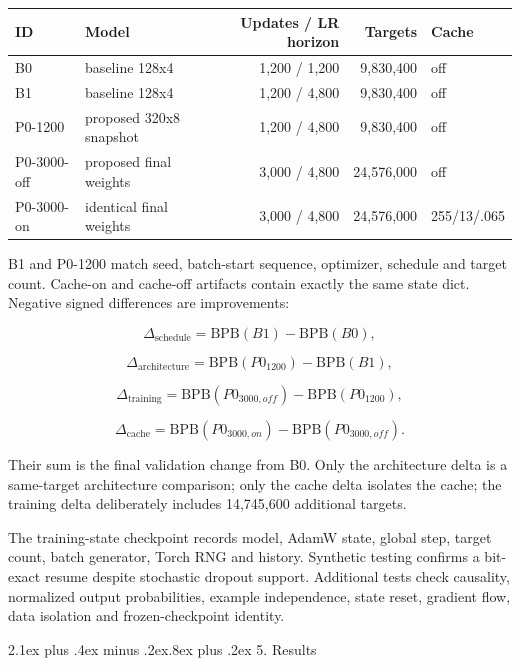 \documentclass[11pt]{article}
\makeatletter
\renewcommand\section{\@startsection{section}{1}{0pt}%
  {2.1ex plus .4ex minus .2ex}{.8ex plus .2ex}%
  {\normalfont\large\bfseries}}
\makeatother
\begin{document}
\begin{longtable}[]{@{}llrrl@{}}
\toprule\noalign{}
ID & Model & Updates / LR horizon & Targets & Cache \\
\midrule\noalign{}
\endhead
\bottomrule\noalign{}
\endlastfoot
B0 & baseline 128x4 & 1,200 / 1,200 & 9,830,400 & off \\
B1 & baseline 128x4 & 1,200 / 4,800 & 9,830,400 & off \\
P0-1200 & proposed 320x8 snapshot & 1,200 / 4,800 & 9,830,400 & off \\
P0-3000-off & proposed final weights & 3,000 / 4,800 & 24,576,000 &
off \\
P0-3000-on & identical final weights & 3,000 / 4,800 & 24,576,000 &
255/13/.065 \\
\end{longtable}

B1 and P0-1200 match seed, batch-start sequence, optimizer, schedule and
target count. Cache-on and cache-off artifacts contain exactly the same
state dict. Negative signed differences are improvements:

\[
\Delta_{\mathrm{schedule}}=\mathrm{BPB}(B1)-\mathrm{BPB}(B0),
\]

\[
\Delta_{\mathrm{architecture}}=
\mathrm{BPB}(P0_{1200})-\mathrm{BPB}(B1),
\]

\[
\Delta_{\mathrm{training}}=
\mathrm{BPB}(P0_{3000,off})-\mathrm{BPB}(P0_{1200}),
\]

\[
\Delta_{\mathrm{cache}}=
\mathrm{BPB}(P0_{3000,on})-\mathrm{BPB}(P0_{3000,off}).
\]

Their sum is the final validation change from B0. Only the architecture
delta is a same-target architecture comparison; only the cache delta
isolates the cache; the training delta deliberately includes 14,745,600
additional targets.

The training-state checkpoint records model, AdamW state, global step,
target count, batch generator, Torch RNG and history. Synthetic testing
confirms a bit-exact resume despite stochastic dropout support.
Additional tests check causality, normalized output probabilities,
example independence, state reset, gradient flow, data isolation and
frozen-checkpoint identity.

\section{5. Results}\label{5-results}
\end{document}
